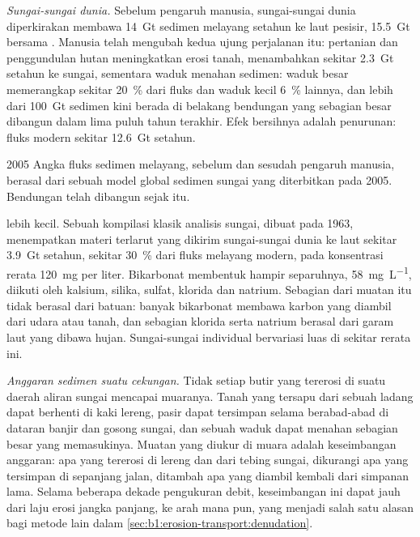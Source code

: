 \emph{Sungai-sungai dunia.} Sebelum pengaruh manusia, sungai-sungai dunia diperkirakan membawa \qty{14}{Gt} sedimen melayang setahun ke laut pesisir, \qty{15.5}{Gt} bersama . Manusia telah mengubah kedua ujung perjalanan itu: pertanian dan penggundulan hutan meningkatkan erosi tanah, menambahkan sekitar \qty{2.3}{Gt} setahun ke sungai, sementara waduk menahan sedimen: waduk besar memerangkap sekitar \qty{20}{\percent} dari fluks dan waduk kecil \qty{6}{\percent} lainnya, dan lebih dari \qty{100}{Gt} sedimen kini berada di belakang bendungan yang sebagian besar dibangun dalam lima puluh tahun terakhir. Efek bersihnya adalah penurunan: fluks modern sekitar \qty{12.6}{Gt} setahun.

\begin{dated}{2005}
Angka fluks sedimen melayang, sebelum dan sesudah pengaruh manusia, berasal dari sebuah model global sedimen sungai yang diterbitkan pada 2005. Bendungan telah dibangun sejak itu.
\end{dated}

 lebih kecil. Sebuah kompilasi klasik analisis sungai, dibuat pada 1963, menempatkan materi terlarut yang dikirim sungai-sungai dunia ke laut sekitar \qty{3.9}{Gt} setahun, sekitar \qty{30}{\percent} dari fluks melayang modern, pada konsentrasi rerata \qty{120}{mg} per liter. Bikarbonat membentuk hampir separuhnya, \qty{58}{mg.L^{-1}}, diikuti oleh kalsium, silika, sulfat, klorida dan natrium. Sebagian dari muatan itu tidak berasal dari batuan: banyak bikarbonat membawa karbon yang diambil dari udara atau tanah, dan sebagian klorida serta natrium berasal dari garam laut yang dibawa hujan. Sungai-sungai individual bervariasi luas di sekitar rerata ini.

\emph{Anggaran sedimen suatu cekungan.} Tidak setiap butir yang tererosi di suatu daerah aliran sungai mencapai muaranya. Tanah yang tersapu dari sebuah ladang dapat berhenti di kaki lereng, pasir dapat tersimpan selama berabad-abad di dataran banjir dan gosong sungai, dan sebuah waduk dapat menahan sebagian besar yang memasukinya. Muatan yang diukur di muara adalah keseimbangan anggaran: apa yang tererosi di lereng dan dari tebing sungai, dikurangi apa yang tersimpan di sepanjang jalan, ditambah apa yang diambil kembali dari simpanan lama. Selama beberapa dekade pengukuran debit, keseimbangan ini dapat jauh dari laju erosi jangka panjang, ke arah mana pun, yang menjadi salah satu alasan bagi metode lain dalam \cref{sec:b1:erosion-transport:denudation}.

